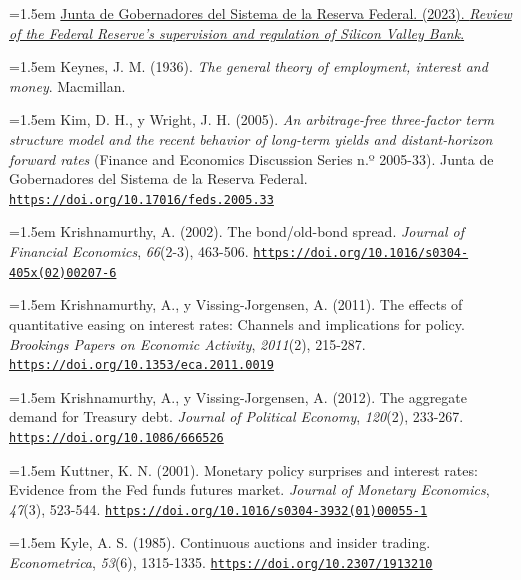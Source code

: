 \documentclass[10pt,a4paper]{article}
\begin{document}
\noindent\hangindent=1.5em \href{https://www.federalreserve.gov/publications/2023-April-SVB-Preface.htm}{Junta de Gobernadores del Sistema de la Reserva Federal. (2023). \textit{Review of the Federal Reserve's supervision and regulation of Silicon Valley Bank}.}

\noindent\hangindent=1.5em Keynes, J. M. (1936). \textit{The general theory of employment, interest and money}. Macmillan.

\noindent\hangindent=1.5em Kim, D. H., y Wright, J. H. (2005). \textit{An arbitrage-free three-factor term structure model and the recent behavior of long-term yields and distant-horizon forward rates} (Finance and Economics Discussion Series n.º 2005-33). Junta de Gobernadores del Sistema de la Reserva Federal. \href{https://doi.org/10.17016/feds.2005.33}{\nolinkurl{https://doi.org/10.17016/feds.2005.33}}

\noindent\hangindent=1.5em Krishnamurthy, A. (2002). The bond/old-bond spread. \textit{Journal of Financial Economics}, \textit{66}(2-3), 463-506. \href{https://doi.org/10.1016/s0304-405x(02)00207-6}{\nolinkurl{https://doi.org/10.1016/s0304-405x(02)00207-6}}

\noindent\hangindent=1.5em Krishnamurthy, A., y Vissing-Jorgensen, A. (2011). The effects of quantitative easing on interest rates: Channels and implications for policy. \textit{Brookings Papers on Economic Activity}, \textit{2011}(2), 215-287. \href{https://doi.org/10.1353/eca.2011.0019}{\nolinkurl{https://doi.org/10.1353/eca.2011.0019}}

\noindent\hangindent=1.5em Krishnamurthy, A., y Vissing-Jorgensen, A. (2012). The aggregate demand for Treasury debt. \textit{Journal of Political Economy}, \textit{120}(2), 233-267. \href{https://doi.org/10.1086/666526}{\nolinkurl{https://doi.org/10.1086/666526}}

\noindent\hangindent=1.5em Kuttner, K. N. (2001). Monetary policy surprises and interest rates: Evidence from the Fed funds futures market. \textit{Journal of Monetary Economics}, \textit{47}(3), 523-544. \href{https://doi.org/10.1016/s0304-3932(01)00055-1}{\nolinkurl{https://doi.org/10.1016/s0304-3932(01)00055-1}}

{\sloppy\noindent\hangindent=1.5em Kyle, A. S. (1985). Continuous auctions and insider trading. \textit{Econometrica}, \textit{53}(6), 1315-1335. \href{https://doi.org/10.2307/1913210}{\nolinkurl{https://doi.org/10.2307/1913210}}\par}
\end{document}

